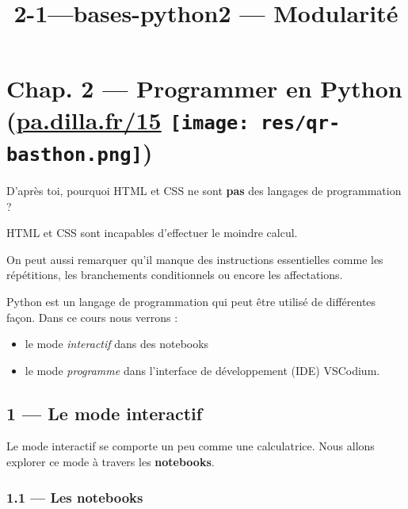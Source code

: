 \documentclass[a4paper,17pt]{extarticle}
\title{2-1---bases-python}
\providecommand{\tightlist}{%
      \setlength{\itemsep}{0pt}\setlength{\parskip}{0pt}}
\begin{document}
    
    \title{2 --- Modularité}

    
    

    
    \hypertarget{chap.-2-programmer-en-python-pa.dilla.fr15}{%
\section[Chap. 2 --- Programmer en Python
(\href{https://pa.dilla.fr/15}{pa.dilla.fr/15} )]{\texorpdfstring{Chap.
2 --- Programmer en Python
(\href{https://pa.dilla.fr/15}{pa.dilla.fr/15}
\protect\texttt{[image: res/qr-basthon.png]})}{Chap. 2 --- Programmer en Python (pa.dilla.fr/15 )}}\label{chap.-2-programmer-en-python-pa.dilla.fr15}}

    D'après toi, pourquoi HTML et CSS ne sont \textbf{pas} des langages de
programmation ?

    HTML et CSS sont incapables d'effectuer le moindre calcul.

On peut aussi remarquer qu'il manque des instructions essentielles comme
les répétitions, les branchements conditionnels ou encore les
affectations.

    Python est un langage de programmation qui peut être utilisé de
différentes façon. Dans ce cours nous verrons :

\begin{itemize}
\tightlist
\item
  le mode \emph{interactif} dans des notebooks
\item
  le mode \emph{programme} dans l'interface de développement (IDE)
  VSCodium.
\end{itemize}

    \hypertarget{le-mode-interactif}{%
\subsection{1 --- Le mode interactif}\label{le-mode-interactif}}

    Le mode interactif se comporte un peu comme une calculatrice. Nous
allons explorer ce mode à travers les \textbf{notebooks}.

    \hypertarget{les-notebooks}{%
\subsubsection{1.1 --- Les notebooks}\label{les-notebooks}}
\end{document}
